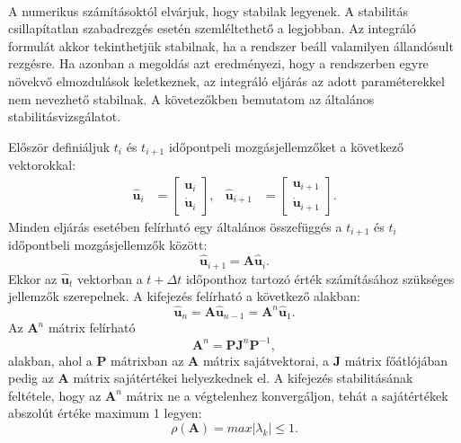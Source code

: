 {\ }

A numerikus számításoktól elvárjuk, hogy stabilak legyenek. A stabilitás csillapítatlan szabadrezgés esetén szemléltethető a legjobban. Az  integráló formulát akkor tekinthetjük stabilnak, ha a rendszer beáll valamilyen állandósult rezgésre. Ha  azonban a megoldás azt eredményezi, hogy a rendszerben egyre növekvő elmozdulások keletkeznek, az integráló eljárás az adott paraméterekkel nem nevezhető stabilnak. A követezőkben bemutatom az általános stabilitásvizsgálatot.

Először definiáljuk $t_i$ és $t_{i+1}$ időpontpeli mozgásjellemzőket a következő vektorokkal:
\begin{align*}
\mathbf{\hat{u}}_i & = \left[ \begin{array}{cc} \mathbf{u}_i \\ \mathbf{\dot{u}}_i \end{array} \right], & \mathbf{\hat{u}}_{i+1} & = \left[ \begin{array}{cc} \mathbf{u}_{i+1} \\ \mathbf{\dot{u}}_{i+1} \end{array} \right].
\end{align*}
Minden eljárás esetében felírható egy általános összefüggés a $t_{i+1}$ és $t_i$ időpontbeli mozgásjellemzők között:
\begin{equation}
\label{stab}
\mathbf{\hat{u}}_{i+1} = \mathbf{A}\mathbf{\hat{u}}_i.
\end{equation}
Ekkor az $\mathbf{\hat{u}}_t$ vektorban a $t+\Delta{t}$ időponthoz tartozó érték számításához szükséges jellemzők szerepelnek. A kifejezés felírható a következő alakban:
\begin{equation*}
\mathbf{\hat{u}}_{n} = \mathbf{A}\mathbf{\hat{u}}_{n-1} = \mathbf{A}^{n}\mathbf{\hat{u}}_1.
\end{equation*}
Az $\mathbf{A}^n$ mátrix felírható
\begin{equation*}
\mathbf{A}^n = \mathbf{P}\mathbf{J}^n\mathbf{P}^{-1},
\end{equation*}
alakban, ahol a $\mathbf{P}$ mátrixban az $\mathbf{A}$ mátrix sajátvektorai, a $\mathbf{J}$ mátrix főátlójában pedig az $\mathbf{A}$ mátrix sajátértékei helyezkednek el. A kifejezés stabilitásának feltétele, hogy az $\mathbf{A}^n$ mátrix ne a végtelenhez konvergáljon, tehát a sajátértékek  abszolút értéke maximum 1 legyen:
\begin{equation}
\rho\left(\mathbf{A}\right) = max|\lambda_k| \leq 1.
\label{stab felt}
\end{equation}  

